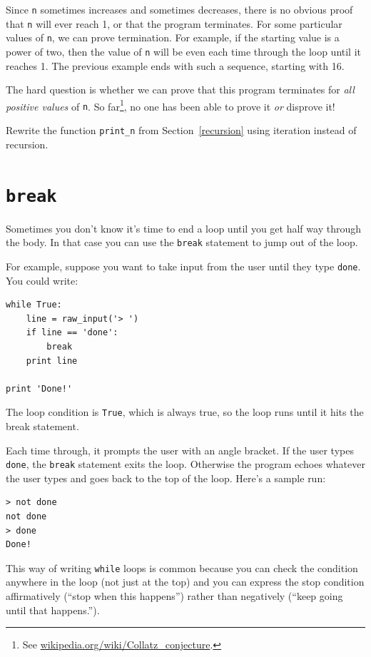 \documentclass[10pt]{book}
\begin{document}
Since {\tt n} sometimes increases and sometimes decreases, there is no
obvious proof that {\tt n} will ever reach 1, or that the program
terminates.  For some particular values of {\tt n}, we can prove
termination.  For example, if the starting value is a power of two,
then the value of {\tt n} will be even each time through the loop
until it reaches 1. The previous example ends with such a sequence,
starting with 16.


The hard question is whether we can prove that this program terminates
for {\em all positive values} of {\tt n}.  So far\footnote{See
  \url{wikipedia.org/wiki/Collatz_conjecture}.}, no one has
been able to prove it {\em or} disprove it!

\begin{ex}
Rewrite the function \verb"print_n" from
Section~\ref{recursion} using iteration instead of recursion.
\end{ex}


\section{{\tt break}}

Sometimes you don't know it's time to end a loop until you get half
way through the body.  In that case you can use the {\tt break}
statement to jump out of the loop.

For example, suppose you want to take input from the user until they
type {\tt done}.  You could write:

\beforeverb
\begin{verbatim}
while True:
    line = raw_input('> ')
    if line == 'done':
        break
    print line

print 'Done!'
\end{verbatim}
\afterverb
%
The loop condition is {\tt True}, which is always true, so the
loop runs until it hits the break statement.

Each time through, it prompts the user with an angle bracket.
If the user types {\tt done}, the {\tt break} statement exits
the loop.  Otherwise the program echoes whatever the user types
and goes back to the top of the loop.  Here's a sample run:

\beforeverb
\begin{verbatim}
> not done
not done
> done
Done!
\end{verbatim}
\afterverb
%
This way of writing {\tt while} loops is common because you
can check the condition anywhere in the loop (not just at the
top) and you can express the stop condition affirmatively
(``stop when this happens'') rather than negatively (``keep going
until that happens.'').
\end{document}

